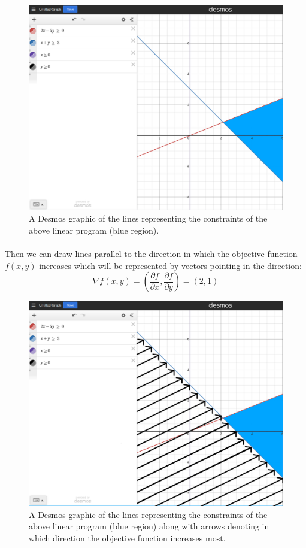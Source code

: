 \documentclass{article}
\begin{document}
\begin{figure}
    \centering
    \includegraphics[width = \textwidth]{desmos_lp_edited.png}
    \caption{A Desmos graphic of the lines representing the constraints of the above linear program (blue region).}
    \label{fig:desmos-lp}
\end{figure}
\paragraph{}Then we can draw lines parallel to the direction in which the objective function $f(x, y)$ increases which will be represented by vectors pointing in the direction: $$\nabla f(x,y) = (\frac{\partial f}{\partial x}, \frac{\partial f}{\partial y}) = (2,1)$$

\pagebreak

\begin{figure}
    \centering
    \includegraphics[width=\textwidth]{desmos_lp_edited_2.png}
    \caption{A Desmos graphic of the lines representing the constraints of the above linear program (blue region) along with arrows denoting in which direction the objective function increases most.}
    \label{fig:enter-label}
\end{figure}
\end{document}
